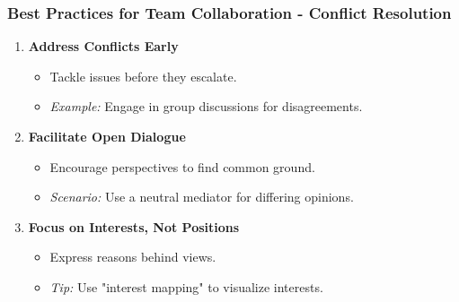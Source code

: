 \documentclass[aspectratio=169]{beamer}
\begin{document}
\begin{frame}[fragile]
    \frametitle{Best Practices for Team Collaboration - Conflict Resolution}
    \begin{enumerate}
        \item \textbf{Address Conflicts Early} 
        \begin{itemize}
            \item Tackle issues before they escalate.
            \item \textit{Example:} Engage in group discussions for disagreements.
        \end{itemize}
        
        \item \textbf{Facilitate Open Dialogue} 
        \begin{itemize}
            \item Encourage perspectives to find common ground.
            \item \textit{Scenario:} Use a neutral mediator for differing opinions.
        \end{itemize}
        
        \item \textbf{Focus on Interests, Not Positions} 
        \begin{itemize}
            \item Express reasons behind views.
            \item \textit{Tip:} Use "interest mapping" to visualize interests.
        \end{itemize}
    \end{enumerate}
\end{frame}
\end{document}
